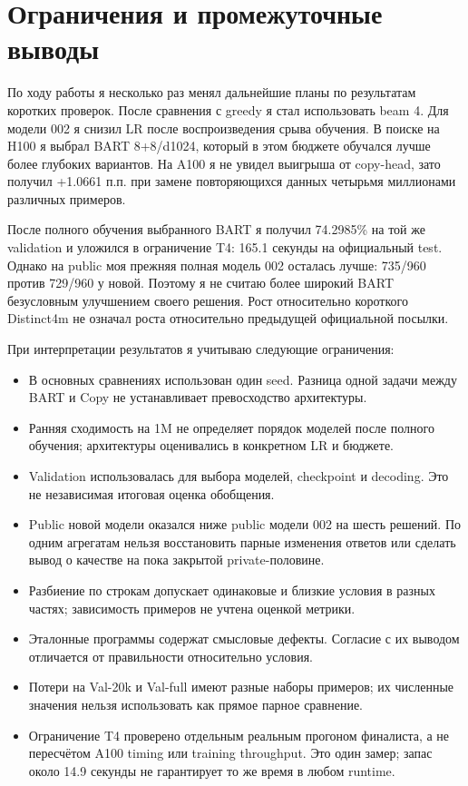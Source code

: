 \section{Ограничения и промежуточные выводы}

По ходу работы я несколько раз менял дальнейшие планы по результатам
коротких проверок. После сравнения с greedy я стал использовать beam 4.
Для модели 002 я снизил LR после воспроизведения срыва обучения.
В поиске на H100 я выбрал BART 8+8/d1024, который в этом бюджете
обучался лучше более глубоких вариантов. На A100 я не увидел выигрыша
от copy-head, зато получил +1.0661 п.п. при замене повторяющихся
данных четырьмя миллионами различных примеров.

После полного обучения выбранного BART я получил 74.2985\% на той же
validation и уложился в ограничение T4: 165.1 секунды на официальный test.
Однако на public моя прежняя полная модель 002 осталась лучше:
735/960 против 729/960 у новой. Поэтому я не считаю более широкий BART
безусловным улучшением своего решения. Рост относительно короткого
Distinct4m не означал роста относительно предыдущей официальной посылки.

При интерпретации результатов я учитываю следующие ограничения:
\begin{itemize}
\item В основных сравнениях использован один seed. Разница одной задачи
между BART и Copy не устанавливает превосходство архитектуры.
\item Ранняя сходимость на 1M не определяет порядок моделей после полного
обучения; архитектуры оценивались в конкретном LR и бюджете.
\item Validation использовалась для выбора моделей, checkpoint и decoding.
Это не независимая итоговая оценка обобщения.
\item Public новой модели оказался ниже public модели 002 на шесть решений.
По одним агрегатам нельзя восстановить парные изменения ответов
или сделать вывод о качестве на пока закрытой private-половине.
\item Разбиение по строкам допускает одинаковые и близкие условия
в разных частях; зависимость примеров не учтена оценкой метрики.
\item Эталонные программы содержат смысловые дефекты. Согласие с их
выводом отличается от правильности относительно условия.
\item Потери на Val-20k и Val-full имеют разные наборы примеров;
их численные значения нельзя использовать как прямое парное сравнение.
\item Ограничение T4 проверено отдельным реальным прогоном финалиста,
а не пересчётом A100 timing или training throughput. Это один замер;
запас около 14.9 секунды не гарантирует то же время в любом runtime.
\end{itemize}


